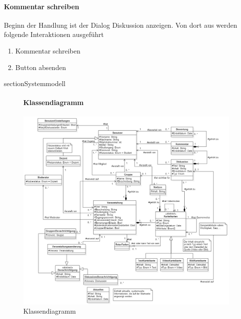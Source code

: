 \documentclass[12pt,a4paper]{article}
\begin{document}
{\paragraph{Kommentar schreiben}
Beginn der Handlung ist der Dialog \glqq Diskussion anzeigen\grqq. Von dort aus werden folgende Interaktionen ausgeführt
\begin{enumerate}
\item \glqq Kommentar schreiben\grqq
\item \glqq Button absenden\grqq
\end{enumerate}


section{Systemmodell}

\begin{figure}[H]
	\centering
	\paragraph{Klassendiagramm}
	\includegraphics[width=\textwidth]{Bilder/Klassendiagramm/Klassendiagramm.png}
	\caption{Klassendiagramm}
	\label{vollstaendigesKlassendiagramm}
\end{figure}


}
\end{document}
